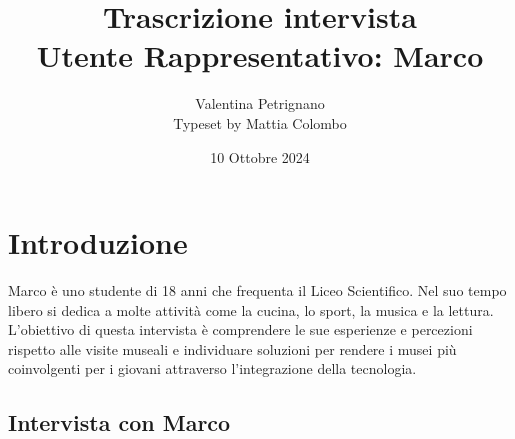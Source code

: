 \documentclass{article}
\title{\textbf{Trascrizione intervista}\\ Utente Rappresentativo: Marco}
\author{Valentina Petrignano \\ Typeset by Mattia Colombo}
\date{10 Ottobre 2024}
\begin{document}
\maketitle

\section{Introduzione}
Marco è uno studente di 18 anni che frequenta il Liceo Scientifico. Nel suo tempo libero si dedica a molte attività come la cucina, lo sport, la musica e la lettura. L’obiettivo di questa intervista è comprendere le sue esperienze e percezioni rispetto alle visite museali e individuare soluzioni per rendere i musei più coinvolgenti per i giovani attraverso l’integrazione della tecnologia.

\subsection{\textcolor{subsectioncolor}{Intervista con Marco}}
\end{document}
